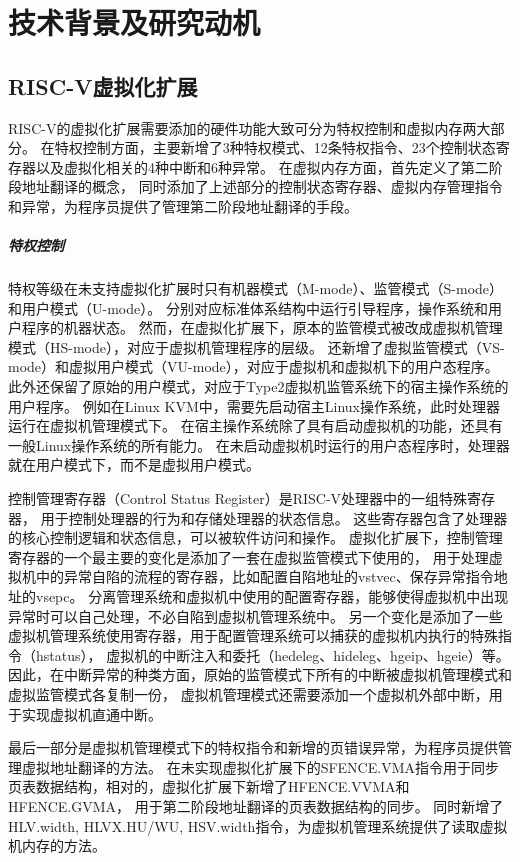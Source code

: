 \chapter{技术背景及研究动机}

\section{RISC-V虚拟化扩展}
RISC-V的虚拟化扩展需要添加的硬件功能大致可分为特权控制和虚拟内存两大部分。
在特权控制方面，主要新增了3种特权模式、12条特权指令、23个控制状态寄存器以及虚拟化相关的4种中断和6种异常。
在虚拟内存方面，首先定义了第二阶段地址翻译的概念，
同时添加了上述部分的控制状态寄存器、虚拟内存管理指令和异常，为程序员提供了管理第二阶段地址翻译的手段。

\paragraph{特权控制}
特权等级在未支持虚拟化扩展时只有机器模式（M-mode）、监管模式（S-mode）和用户模式（U-mode）。
分别对应标准体系结构中运行引导程序，操作系统和用户程序的机器状态。
然而，在虚拟化扩展下，原本的监管模式被改成虚拟机管理模式（HS-mode），对应于虚拟机管理程序的层级。
还新增了虚拟监管模式（VS-mode）和虚拟用户模式（VU-mode），对应于虚拟机和虚拟机下的用户态程序。
此外还保留了原始的用户模式，对应于Type2虚拟机监管系统下的宿主操作系统的用户程序。
例如在Linux KVM中，需要先启动宿主Linux操作系统，此时处理器运行在虚拟机管理模式下。
在宿主操作系统除了具有启动虚拟机的功能，还具有一般Linux操作系统的所有能力。
在未启动虚拟机时运行的用户态程序时，处理器就在用户模式下，而不是虚拟用户模式。

控制管理寄存器（Control Status Register）是RISC-V处理器中的一组特殊寄存器，
用于控制处理器的行为和存储处理器的状态信息。
这些寄存器包含了处理器的核心控制逻辑和状态信息，可以被软件访问和操作。
虚拟化扩展下，控制管理寄存器的一个最主要的变化是添加了一套在虚拟监管模式下使用的，
用于处理虚拟机中的异常自陷的流程的寄存器，比如配置自陷地址的vstvec、保存异常指令地址的vsepc。
分离管理系统和虚拟机中使用的配置寄存器，能够使得虚拟机中出现异常时可以自己处理，不必自陷到虚拟机管理系统中。
另一个变化是添加了一些虚拟机管理系统使用寄存器，用于配置管理系统可以捕获的虚拟机内执行的特殊指令（hstatus），
虚拟机的中断注入和委托（hedeleg、hideleg、hgeip、hgeie）等。
因此，在中断异常的种类方面，原始的监管模式下所有的中断被虚拟机管理模式和虚拟监管模式各复制一份，
虚拟机管理模式还需要添加一个虚拟机外部中断，用于实现虚拟机直通中断。

最后一部分是虚拟机管理模式下的特权指令和新增的页错误异常，为程序员提供管理虚拟地址翻译的方法。
在未实现虚拟化扩展下的SFENCE.VMA指令用于同步页表数据结构，相对的，虚拟化扩展下新增了HFENCE.VVMA和HFENCE.GVMA，
用于第二阶段地址翻译的页表数据结构的同步。
同时新增了HLV.width, HLVX.HU/WU, HSV.width指令，为虚拟机管理系统提供了读取虚拟机内存的方法。

